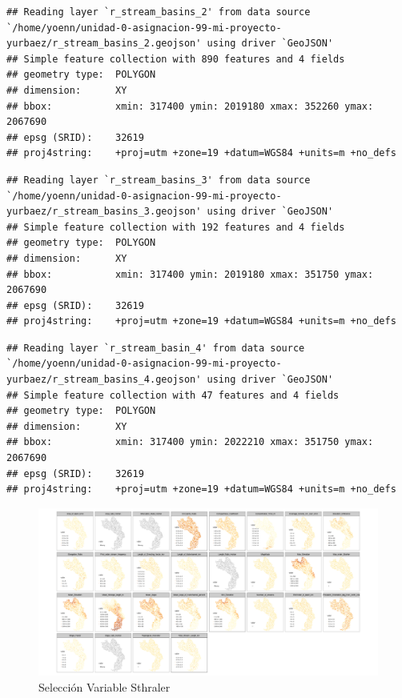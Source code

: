 \documentclass[11pt,]{article}
\begin{document}
\begin{verbatim}
## Reading layer `r_stream_basins_2' from data source `/home/yoenn/unidad-0-asignacion-99-mi-proyecto-yurbaez/r_stream_basins_2.geojson' using driver `GeoJSON'
## Simple feature collection with 890 features and 4 fields
## geometry type:  POLYGON
## dimension:      XY
## bbox:           xmin: 317400 ymin: 2019180 xmax: 352260 ymax: 2067690
## epsg (SRID):    32619
## proj4string:    +proj=utm +zone=19 +datum=WGS84 +units=m +no_defs
\end{verbatim}

\begin{verbatim}
## Reading layer `r_stream_basins_3' from data source `/home/yoenn/unidad-0-asignacion-99-mi-proyecto-yurbaez/r_stream_basins_3.geojson' using driver `GeoJSON'
## Simple feature collection with 192 features and 4 fields
## geometry type:  POLYGON
## dimension:      XY
## bbox:           xmin: 317400 ymin: 2019180 xmax: 351750 ymax: 2067690
## epsg (SRID):    32619
## proj4string:    +proj=utm +zone=19 +datum=WGS84 +units=m +no_defs
\end{verbatim}

\begin{verbatim}
## Reading layer `r_stream_basin_4' from data source `/home/yoenn/unidad-0-asignacion-99-mi-proyecto-yurbaez/r_stream_basins_4.geojson' using driver `GeoJSON'
## Simple feature collection with 47 features and 4 fields
## geometry type:  POLYGON
## dimension:      XY
## bbox:           xmin: 317400 ymin: 2022210 xmax: 351750 ymax: 2067690
## epsg (SRID):    32619
## proj4string:    +proj=utm +zone=19 +datum=WGS84 +units=m +no_defs
\end{verbatim}

\begin{figure}
\centering
\includegraphics{Imagenes/Var_Sthraler.png}
\caption{Selección Variable Sthraler}
\end{figure}
\end{document}
